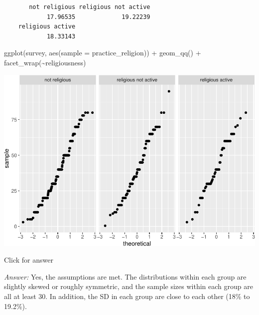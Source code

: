 \documentclass[
]{book}
\newenvironment{Shaded}{\begin{snugshade}}{\end{snugshade}}
\newcommand{\AttributeTok}[1]{\textcolor[rgb]{0.77,0.63,0.00}{#1}}
\newcommand{\CommentTok}[1]{\textcolor[rgb]{0.56,0.35,0.01}{\textit{#1}}}
\newcommand{\ConstantTok}[1]{\textcolor[rgb]{0.00,0.00,0.00}{#1}}
\newcommand{\FunctionTok}[1]{\textcolor[rgb]{0.00,0.00,0.00}{#1}}
\newcommand{\NormalTok}[1]{#1}
\newcommand{\SpecialCharTok}[1]{\textcolor[rgb]{0.00,0.00,0.00}{#1}}
\begin{document}
\begin{Shaded}
\end{Shaded}

\begin{verbatim}
       not religious religious not active 
            17.96535             19.22239 
    religious active 
            18.33143 
\end{verbatim}

\begin{Shaded}
\begin{Highlighting}[]
\FunctionTok{ggplot}\NormalTok{(survey, }\FunctionTok{aes}\NormalTok{(}\AttributeTok{sample =}\NormalTok{ practice\_religion)) }\SpecialCharTok{+} \FunctionTok{geom\_qq}\NormalTok{() }\SpecialCharTok{+} \FunctionTok{facet\_wrap}\NormalTok{(}\SpecialCharTok{\textasciitilde{}}\NormalTok{religiousness)}
\end{Highlighting}
\end{Shaded}

\includegraphics[width=1\linewidth]{Class_Activity_23_files/figure-latex/unnamed-chunk-5-1}

Click for answer

\emph{Answer:} Yes, the assumptions are met. The distributions within each group are slightly skewed or roughly symmetric, and the sample sizes within each group are all at least 30. In addition, the SD in each group are close to each other (18\% to 19.2\%).
\end{document}
